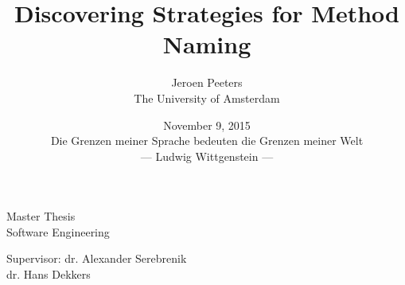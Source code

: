 \documentclass{article}%
\begin{document}
\title{Discovering Strategies for Method Naming}
\author{Jeroen Peeters
\\The University of Amsterdam}
\date{November 9, 2015 \\\vspace*{12.5cm}\small{Die Grenzen meiner Sprache bedeuten die Grenzen meiner Welt\\--- Ludwig Wittgenstein ---}} %
\maketitle
\thispagestyle{empty}
\newpage

\begin{center}
Master Thesis \\
Software Engineering \\
\vspace{1cm}

\vspace{1cm}
Supervisor: dr. Alexander Serebrenik\\
\hspace{7 mm}dr. Hans Dekkers\\
\end{center}
\thispagestyle{empty}
\newpage


\renewcommand{\contentsname}{ \begin{center} --- Table of Contents --- \end{center}}
\setcounter{tocdepth}{1}
\tableofcontents
{}
\newpage







\newpage
{}


\appendix




\end{document}
